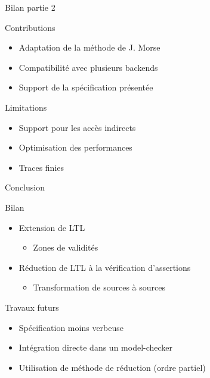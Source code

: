 \documentclass{beamer}
\begin{document}
\begin{frame}{Bilan partie 2}

  \begin{block}{Contributions}
  \begin{itemize}
  \item Adaptation de la méthode de J. Morse
  \item Compatibilité avec plusieurs backends
  \item Support de la spécification présentée
  \end{itemize}
  \end{block}

  \begin{alertblock}{Limitations}
  \begin{itemize}
  \item Support pour les accès indirects
  \item Optimisation des performances
  \item Traces finies
  \end{itemize}
  \end{alertblock}
\end{frame}


\begin{frame}{Conclusion}

  \begin{block}{Bilan}
  \begin{itemize}

    \item Extension de LTL
      \begin{itemize}
      \item Zones de validités
      \end{itemize}
    \item Réduction de LTL à la vérification d'assertions
      \begin{itemize}
      \item Transformation de sources à sources
      \end{itemize}
  \end{itemize}
  \end{block}

  \begin{block}{Travaux futurs}
      \begin{itemize}
        \item Spécification moins verbeuse
        \item Intégration directe dans un model-checker
        \item Utilisation de méthode de réduction (ordre partiel)
      \end{itemize}
  \end{block}

\end{frame}
\end{document}

